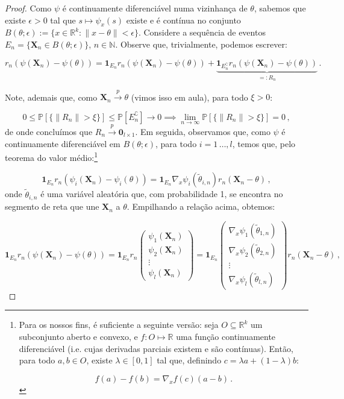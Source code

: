 \documentclass[12pt,a4paper]{article}
\begin{document}
	\begin{proof}
		Como $\psi$ é continuamente diferenciável numa vizinhança de $\theta$, sabemos que existe $\epsilon > 0$ tal que $s \mapsto \psi_x(s)$ existe e é contínua no conjunto $B(\theta;\epsilon) := \{x \in \mathbb{R}^k: \lVert x-\theta \rVert < \epsilon \}$. Considere a sequência de eventos $E_n = \{\boldsymbol{X}_n \in B(\theta;\epsilon)\}$, $n \in \mathbb{N}$. Observe que, trivialmente, podemos escrever:
		
		$$r_n(\psi(\boldsymbol{X}_n)-\psi(\theta)) = \mathbf{1}_{E_n}r_n(\psi(\boldsymbol{X}_n)-\psi(\theta)) + \underbrace{\mathbf{1}_{E_n^\complement} r_n(\psi(\boldsymbol{X}_n)-\psi(\theta))}_{=: R_n}\, .$$
		
		Note, ademais que, como $\boldsymbol{X}_n \overset{p}{\to} \theta$ (vimos isso em aula), para todo $\xi > 0$:
		
		$$0 \leq \mathbb{P}[\{\lVert R_n \rVert>\xi\}] \leq \mathbb{P}[E^\complement_n] \to 0 \implies \lim_{n \to \infty} \mathbb{P}[\{\lVert R_n \rVert>\xi\}] = 0\, ,$$
		de onde concluímos que $ R_n \overset{p}{\to} \boldsymbol{0}_{l \times 1}$. Em seguida, observamos que, como $\psi$ é continuamente diferenciável em $B(\theta;\epsilon)$, para todo $i =1\, \ldots, l$, temos que, pelo teorema do valor médio:\footnote{Para os nossos fins, é suficiente a seguinte versão: seja $O \subseteq \mathbb{R}^k$ um subconjunto aberto e convexo, e $f: O \mapsto \mathbb{R}$ uma função continuamente diferenciável (i.e. cujas derivadas parciais existem e são contínuas). Então, para todo $a, b \in O$, existe $\lambda \in [0,1]$ tal que, definindo $c = \lambda a + (1-\lambda)b$:
		
		$$f(a)- f(b) = \nabla_x f(c) (a-b)\, .$$
		 }
		
		$$\mathbf{1}_{E_n}r_n(\psi_i(\boldsymbol{X}_n)-\psi_i(\theta)) = \mathbf{1}_{E_n}\nabla_x \psi_i(\tilde{\theta}_{i,n})r_n(\boldsymbol{X}_n - \theta)\, ,$$ 
		onde $\tilde{\theta}_{i,n}$ é uma variável aleatória que, com probabilidade 1, se encontra no segmento de reta que une $\boldsymbol{X}_n$ a $\theta$. Empilhando a relação acima, obtemos:
		
			$$\mathbf{1}_{E_n}r_n(\psi(\boldsymbol{X}_n)-\psi(\theta)) = \mathbf{1}_{E_n}r_n \begin{pmatrix}
				\psi_1(\boldsymbol{X}_n) \\
				\psi_2(\boldsymbol{X}_n)\\
				\vdots \\
				\psi_l(\boldsymbol{X}_n)
			\end{pmatrix} = \mathbf{1}_{E_n}  \begin{pmatrix}
			\nabla_x \psi_1(\tilde{\theta}_{1,n}) \\
		\nabla_x \psi_2(\tilde{\theta}_{2,n})\\
			\vdots \\
		\nabla_x \psi_l(\tilde{\theta}_{l,n})
			\end{pmatrix}r_n(\boldsymbol{X}_n - \theta)\, ,$$ 
			

\end{proof}
\end{document}
